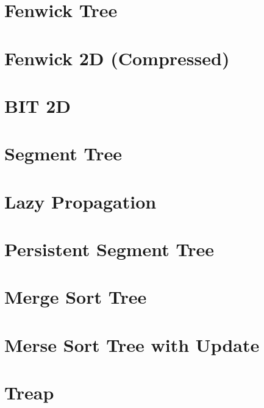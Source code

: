 \section{Fenwick Tree}


\section{Fenwick 2D (Compressed)}


\section{BIT 2D}


\section{Segment Tree}


\section{Lazy Propagation}


\section{Persistent Segment Tree}


\section{Merge Sort Tree}


\section{Merse Sort Tree with Update}


\section{Treap}


